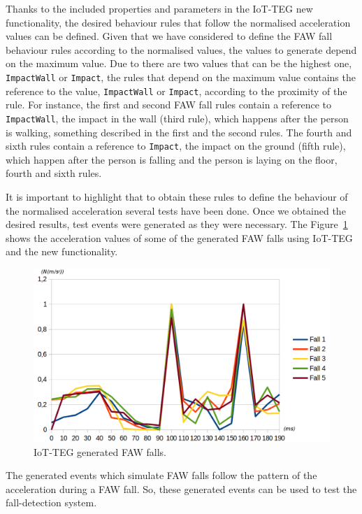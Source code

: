 \documentclass[review]{elsarticle}
\begin{document}
Thanks to the included properties and parameters in the IoT-TEG new functionality, the desired behaviour rules that
follow the normalised acceleration values can be defined. Given that we have considered to define the FAW fall behaviour
rules according to the normalised values, the values to generate depend on the maximum value. Due to there are two 
values that can be the highest one, \texttt{ImpactWall} or \texttt{Impact}, the rules that depend on the maximum 
value contains the reference to the value, \texttt{ImpactWall} or \texttt{Impact}, according to the proximity
of the rule. For instance, the first and second FAW fall rules contain a reference to \texttt{ImpactWall}, the impact 
in the wall (third rule), which happens after the person is walking, something described in the first and the second rules.
The fourth and sixth rules contain a reference to \texttt{Impact}, the impact on the ground (fifth rule), which happen
after the person is falling and the person is laying on the floor, fourth and sixth rules.

It is important to highlight that to obtain these rules to define the behaviour of the normalised acceleration several tests
have been done. Once we obtained the desired results, test events were generated as they were necessary. The 
Figure~\ref{fig:IoTTEGFAWGeneratedEvents} shows the acceleration values of some of the generated FAW falls using
IoT-TEG and the new functionality.

\begin{figure}[!ht]
  \centering
  \includegraphics[scale=0.2]{img/IoTTEGFAWGeneratedEvents}
  \caption[IoT-TEG generated FAW falls]{IoT-TEG generated FAW falls.}
  \label{fig:IoTTEGFAWGeneratedEvents}
\end{figure}

The generated events which simulate FAW falls follow the pattern of the acceleration during a FAW fall.
So, these generated events can be used to test the fall-detection system.
\end{document}
